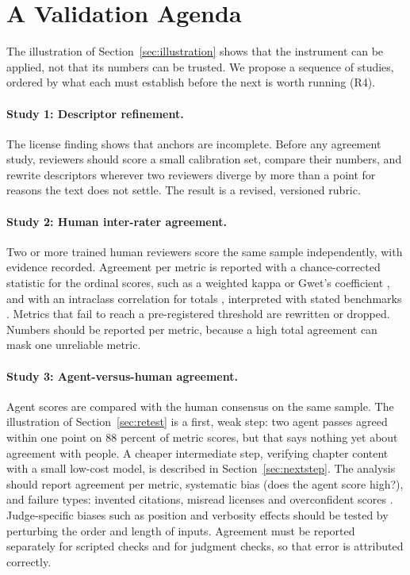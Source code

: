 \section{A Validation Agenda}
\label{sec:validation}

The illustration of Section~\ref{sec:illustration} shows that the instrument can be applied, not that its numbers can be trusted. We propose a sequence of studies, ordered by what each must establish before the next is worth running (R4).

\paragraph{Study 1: Descriptor refinement.}
The license finding shows that anchors are incomplete. Before any agreement study, reviewers should score a small calibration set, compare their numbers, and rewrite descriptors wherever two reviewers diverge by more than a point for reasons the text does not settle. The result is a revised, versioned rubric.

\paragraph{Study 2: Human inter-rater agreement.}
Two or more trained human reviewers score the same sample independently, with evidence recorded. Agreement per metric is reported with a chance-corrected statistic for the ordinal scores, such as a weighted kappa or Gwet's coefficient \cite{cohen1960,gwet2008}, and with an intraclass correlation for totals \cite{shrout1979,koo2016}, interpreted with stated benchmarks \cite{landis1977}. Metrics that fail to reach a pre-registered threshold are rewritten or dropped. Numbers should be reported per metric, because a high total agreement can mask one unreliable metric.

\paragraph{Study 3: Agent-versus-human agreement.}
Agent scores are compared with the human consensus on the same sample. The illustration of Section~\ref{sec:retest} is a first, weak step: two agent passes agreed within one point on 88 percent of metric scores, but that says nothing yet about agreement with people. A cheaper intermediate step, verifying chapter content with a small low-cost model, is described in Section~\ref{sec:nextstep}. The analysis should report agreement per metric, systematic bias (does the agent score high?), and failure types: invented citations, misread licenses and overconfident scores \cite{ji2023}. Judge-specific biases such as position and verbosity effects \cite{zheng2023,wang2024} should be tested by perturbing the order and length of inputs. Agreement must be reported separately for scripted checks and for judgment checks, so that error is attributed correctly.

